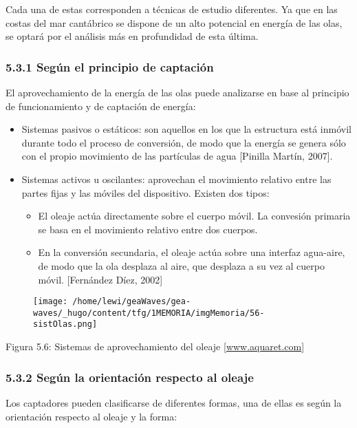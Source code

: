 Cada una de estas corresponden a técnicas de estudio diferentes. Ya que
en las costas del mar cantábrico se dispone de un alto potencial en
energía de las olas, se optará por el análisis más en profundidad de
esta última.

\subsubsection{5.3.1 Según el principio de captación}\label{header-n85}

El aprovechamiento de la energía de las olas puede analizarse en base al
principio de funcionamiento y de captación de energía:

\begin{itemize}
\item
  Sistemas pasivos o estáticos: son aquellos en los que la estructura
  está inmóvil durante todo el proceso de conversión, de modo que la
  energía se genera sólo con el propio movimiento de las partículas de
  agua {[}Pinilla Martín, 2007{]}. 
\item
  Sistemas activos u oscilantes: aprovechan el movimiento relativo entre
  las partes fijas y las móviles del dispositivo. Existen dos tipos:

  \begin{itemize}
  \item
    El oleaje actúa directamente sobre el cuerpo móvil. La convesión
    primaria se basa en el movimiento relativo entre dos cuerpos.
  \item
    En la conversión secundaria, el oleaje actúa sobre una interfaz
    agua-aire, de modo que la ola desplaza al aire, que desplaza a su
    vez al cuerpo móvil. {[}Fernández Díez, 2002{]} 
  \end{itemize}
\end{itemize}

\begin{figure}
\centering
\texttt{[image: /home/lewi/geaWaves/gea-waves/\_hugo/content/tfg/1MEMORIA/imgMemoria/56-sistOlas.png]}
\caption{}
\end{figure}

Figura 5.6: Sistemas de aprovechamiento del oleaje
{[}\url{www.aquaret.com}{]}

\subsubsection{5.3.2 Según la orientación respecto al
oleaje}\label{header-n106}

Los captadores pueden clasificarse de diferentes formas, una de ellas es
según la orientación respecto al oleaje y la forma:

